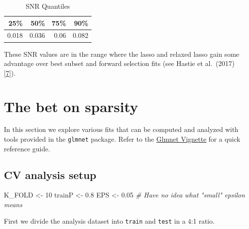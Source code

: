 \documentclass[
]{book}
\newenvironment{Shaded}{\begin{snugshade}}{\end{snugshade}}
\newcommand{\CommentTok}[1]{\textcolor[rgb]{0.56,0.35,0.01}{\textit{#1}}}
\newcommand{\DecValTok}[1]{\textcolor[rgb]{0.00,0.00,0.81}{#1}}
\newcommand{\FloatTok}[1]{\textcolor[rgb]{0.00,0.00,0.81}{#1}}
\newcommand{\NormalTok}[1]{#1}
\newcommand{\StringTok}[1]{\textcolor[rgb]{0.31,0.60,0.02}{#1}}
\begin{document}
\begin{table}

\caption{\label{tab:plotSNR}SNR Quantiles}
\centering
\begin{tabular}[t]{r|r|r|r}
\hline
25\% & 50\% & 75\% & 90\%\\
\hline
0.018 & 0.036 & 0.06 & 0.082\\
\hline
\end{tabular}
\end{table}

These SNR values are in the range where the lasso and relaxed lasso gain some advantage over
best subset and forward selection fits (see Hastie et al.~(2017) {[}\protect\hyperlink{ref-Hastie:2017aa}{7}{]}).

\hypertarget{explore-sparsity}{%
\chapter{The bet on sparsity}\label{explore-sparsity}}

In this section we explore various fits that can be computed
and analyzed with tools provided in the \texttt{glmnet} package.
Refer to the \href{https://web.stanford.edu/~hastie/glmnet/glmnet_alpha.html}{Glmnet Vignette}
for a quick reference guide.

\hypertarget{cv-analysis-setup}{%
\section{CV analysis setup}\label{cv-analysis-setup}}

\begin{Shaded}
\begin{Highlighting}[]
\NormalTok{K\_FOLD <{-}}\StringTok{ }\DecValTok{10}
\NormalTok{trainP <{-}}\StringTok{ }\FloatTok{0.8}
\NormalTok{EPS <{-}}\StringTok{ }\FloatTok{0.05}    \CommentTok{\# Have no idea what "small" epsilon means}
\end{Highlighting}
\end{Shaded}

First we divide the analysis dataset into \texttt{train} and \texttt{test} in a \(4\):1 ratio.
\end{document}
